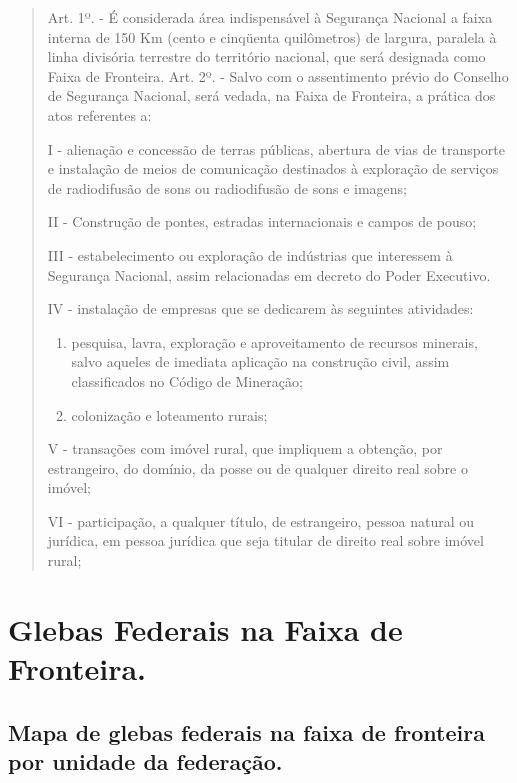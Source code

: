 \documentclass[
  letterpaper,
]{report}
\begin{document}
\begin{quote}
Art. 1º. - É considerada área indispensável à Segurança Nacional a faixa
interna de 150 Km (cento e cinqüenta quilômetros) de largura, paralela à
linha divisória terrestre do território nacional, que será designada
como Faixa de Fronteira. Art. 2º. - Salvo com o assentimento prévio do
Conselho de Segurança Nacional, será vedada, na Faixa de Fronteira, a
prática dos atos referentes a:

I - alienação e concessão de terras públicas, abertura de vias de
transporte e instalação de meios de comunicação destinados à exploração
de serviços de radiodifusão de sons ou radiodifusão de sons e imagens;

II - Construção de pontes, estradas internacionais e campos de pouso;

III - estabelecimento ou exploração de indústrias que interessem à
Segurança Nacional, assim relacionadas em decreto do Poder Executivo.

IV - instalação de empresas que se dedicarem às seguintes atividades:

\begin{enumerate}
\def\labelenumi{\alph{enumi})}
\item
  pesquisa, lavra, exploração e aproveitamento de recursos minerais,
  salvo aqueles de imediata aplicação na construção civil, assim
  classificados no Código de Mineração;
\item
  colonização e loteamento rurais;
\end{enumerate}

V - transações com imóvel rural, que impliquem a obtenção, por
estrangeiro, do domínio, da posse ou de qualquer direito real sobre o
imóvel;

VI - participação, a qualquer título, de estrangeiro, pessoa natural ou
jurídica, em pessoa jurídica que seja titular de direito real sobre
imóvel rural;
\end{quote}

\hypertarget{glebas-federais-na-faixa-de-fronteira.}{%
\section{Glebas Federais na Faixa de
Fronteira.}\label{glebas-federais-na-faixa-de-fronteira.}}

\hypertarget{mapa-de-glebas-federais-na-faixa-de-fronteira-por-unidade-da-federauxe7uxe3o.}{%
\subsection{Mapa de glebas federais na faixa de fronteira por unidade da
federação.}\label{mapa-de-glebas-federais-na-faixa-de-fronteira-por-unidade-da-federauxe7uxe3o.}}
\end{document}
